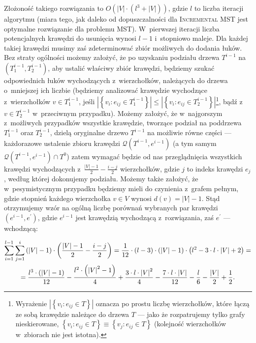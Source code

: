 Złożoność takiego rozwiązania to $O \left( \left| V \right| \cdot \left(l^{3} + \left| V \right| \right) \right)$, gdzie $l$ to liczba iteracji algorytmu (miara tego, jak daleko od dopuszczalności dla \textsc{Incremental MST} jest optymalne rozwiązanie dla problemu \textsc{MST}).
W~pierwszej iteracji liczba potencjalnych krawędzi do usunięcia wynosi $l - 1$ i~stopniowo maleje.
Dla każdej takiej krawędzi musimy zaś zdeterminować zbiór możliwych do dodania łuków.
Bez straty ogólności możemy założyć, że po uzyskaniu podziału drzewa $T^{i-1}$ na $\left( T^{i-1}_{1}, T^{i-1}_{2} \right)$, aby ustalić właściwy zbiór krawędzi, będziemy szukać odpowiednich łuków wychodzących z~wierzchołków, należących do drzewa o~mniejszej ich liczbie (będziemy analizować krawędzie wychodzące z~wierzchołków $v \in T^{i-1}_{1}$, jeśli $\left| \left\{ v_{i} : e_{ij} \in T^{i-1}_{1} \right\} \right| \leqslant \left| \left\{ v_{i} : e_{ij} \in T^{i-1}_{2} \right\} \right|$\footnote{
	Wyrażenie $\left| \left\{ v_{i} : e_{ij} \in T \right\} \right|$ oznacza po prostu liczbę wierzchołków, które łączą ze sobą krawędzie należące do drzewa $T$ --- jako że rozpatrujemy tylko grafy nieskierowane, $\left\{ v_{i} : e_{ij} \in T \right\} \equiv \left\{ v_{j} : e_{ij} \in T \right\}$ (kolejność wierzchołków w~zbiorach nie jest istotna).
}, bądź z~$v \in T^{i-1}_{2}$ w~przeciwnym przypadku).
Możemy założyć, że w~najgorszym z~możliwych przypadków wszystkie krawędzie, tworzące podział na poddrzewa $T^{i-1}_{1}$ oraz $T^{i-1}_{2}$, dzielą oryginalne drzewo $T^{i-1}$ na możliwie równe części --- każdorazowe ustalenie zbioru krawędzi $\mathcal{Q} \left( T^{i-1}, e^{i-1} \right)$ (a tym samym $\mathcal{Q} \left( T^{i-1}, e^{i-1} \right) \cap T^{0}$) zatem wymagać będzie od nas przeglądnięcia wszystkich krawędzi wychodzących z~$\frac{\left| V \right| - 1}{2} - \frac{i - j}{2}$ wierzchołków, gdzie $j$ to indeks krawędzi $e_{j}$, według której dokonujemy podziału.
Możemy także założyć, że w~pesymistycznym przypadku będziemy mieli do czynienia z~grafem pełnym, gdzie stopnień każdego wierzchołka $v \in V$ wynosi $d \left( v \right) = \left| V \right| - 1$.
Stąd otrzymujemy wzór na ogólną liczbę porównań wybranych par krawędzi $\left( e^{i-1}, e^{\prime} \right)$, gdzie $e^{i-1}$ jest krawędzią wychodzącą z~rozwiązania, zaś $e^{\prime}$ --- wchodzącą:

\begin{gather*}
	\sum_{\mathclap{i=1}}^{\mathclap{l-1}} \sum_{\mathclap{j=1}}^{\mathclap{i}} \left( \left| V \right| - 1 \right) \cdot \left( \frac{\left| V \right| - 1}{2} - \frac{i - j}{2} \right) = \frac{1}{12} \cdot \left( l - 3 \right) \cdot \left( \left| V \right| - 1 \right) \cdot \left( l^{2} - 3 \cdot l \cdot \left| V \right| + 2 \right) = \\ 
	= \frac{l^{3} \cdot \left( \left| V \right| - 1 \right)}{12} - \frac{l^{2} \cdot \left( \left| V \right|^{2} - 1 \right)}{4} + \frac{3 \cdot l \cdot \left| V \right|^{2}}{4} - \frac{7 \cdot l \cdot \left| V \right|}{12} - \frac{l}{6} - \frac{\left| V \right|}{2} + \frac{1}{2}\text{.}
\end{gather*}

